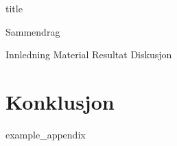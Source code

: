 \documentclass{article}
\begin{document}
{title}

\frontmatter

\tableofcontents

\listoffigures
\listoftables

\mainmatter

{Sammendrag}

{Innledning}
{Material}
{Resultat}
{Diskusjon}


\section{Konklusjon}

\newpage
\printbibliography[heading = bibintoc, title = Bibliography]    %

\addappendix
{example_appendix}

\end{document}
